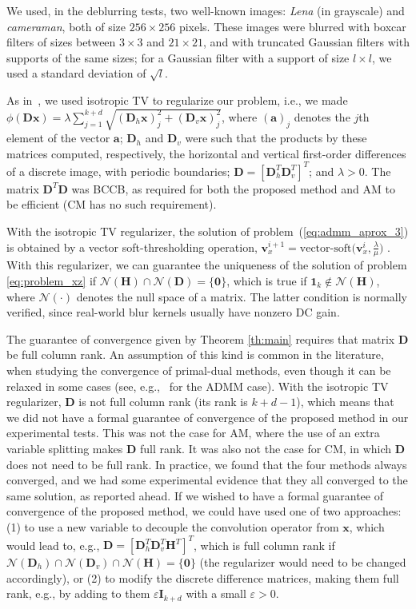\documentclass[10pt,twocolumn,twoside]{IEEEtran}
\newcommand{\Hm}{\mathbf{H}} %
\newcommand{\x}{\mathbf{x}} %
\newcommand{\vs}{\mathbf{v}} %
\newcommand{\D}{\mathbf{D}} %
\newcommand{\I}{\mathbf{I}} %
\begin{document}
We used, in the deblurring tests, two well-known images: \textit{Lena} (in grayscale) and \textit{cameraman}, both of size $256 \times 256$ pixels. These images were blurred with boxcar filters of sizes between $3 \times 3$ and $21 \times 21$, and with truncated Gaussian filters with supports of the same sizes; for a Gaussian filter with a support of size $l \times l$, we used a standard deviation of $\sqrt{l}$.

As in~\cite{Almeida2013a, Matakos2013, Condat2014}, we used isotropic TV to regularize our problem, i.e., we made $\phi(\D \x) = \lambda \sum_{j = 1}^{k + d} \sqrt{(\D_h \x)_j^2 + (\D_v \x)_j^2}$, where $(\mathbf{a})_{j}$ denotes the $j$th element of the vector $\mathbf{a}$; $\D_h$ and $\D_v$ were such that the products by these matrices computed, respectively, the horizontal and vertical first-order differences of a discrete image, with periodic boundaries; $\D = [\D_h^T \D_v^T]^T$; and $\lambda > 0$. The matrix $\D^T \D$ was BCCB, as required for both the proposed method and AM to be efficient (CM has no such requirement).

With the isotropic TV regularizer, the solution of problem~(\ref{eq:admm_aprox_3}) is obtained by a vector soft-thresholding operation, $\vs_x^{i+1} = \text{vector-soft} \big( \vs_x^i, \frac{\lambda}{\mu} \big)$ \cite{Wang2008, Donoho1995}. With this regularizer, we can guarantee the uniqueness of the solution of problem \eqref{eq:problem_xz} if $\mathcal{N}(\Hm) \cap \mathcal{N}(\D) = \{\mathbf 0\}$, which is true if $\textbf{1}_k \notin \mathcal{N}(\Hm)$, where $\mathcal{N}(\cdot)$ denotes the null space of a matrix. The latter condition is normally verified, since real-world blur kernels usually have nonzero DC gain. 

The guarantee of convergence given by Theorem \ref{th:main} requires that matrix $\D$ be full column rank. An assumption of this kind is common in the literature, when studying the convergence of primal-dual methods, even though it can be relaxed in some cases (see, e.g.,~\cite{Boyd2011} for the ADMM case). With the isotropic TV regularizer, $\D$ is not full column rank (its rank is $k+d-1$), which means that we did not have a formal guarantee of convergence of the proposed method in our experimental tests. This was not the case for AM, where the use of an extra variable splitting makes $\D$ full rank. It was also not the case for CM, in which $\D$ does not need to be full rank. In practice, we found that the four methods always converged, and we had some experimental evidence that they all converged to the same solution, as reported ahead. If we wished to have a formal guarantee of convergence of the proposed method, we could have used one of two approaches: (1) to use a new variable to decouple the convolution operator from $\x$, which would lead to, e.g., $\D = [\D_h^T \D_v^T \Hm^T]^T$, which is full column rank if $\mathcal{N}(\D_h) \cap \mathcal{N}(\D_v) \cap \mathcal{N}(\Hm) = \{\mathbf{0}\}$ (the regularizer would need to be changed accordingly), or (2) to modify the discrete difference matrices, making them full rank, e.g., by adding to them $\varepsilon \I_{k+d}$ with a small $\varepsilon > 0$.
\end{document}
